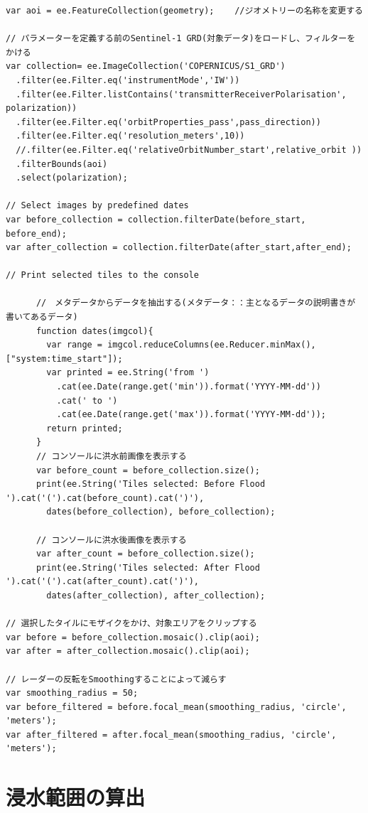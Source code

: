 \documentclass[
]{book}
\begin{document}
\begin{verbatim}
var aoi = ee.FeatureCollection(geometry);    //ジオメトリーの名称を変更する 

// パラメーターを定義する前のSentinel-1 GRD(対象データ)をロードし、フィルターをかける 
var collection= ee.ImageCollection('COPERNICUS/S1_GRD')
  .filter(ee.Filter.eq('instrumentMode','IW'))
  .filter(ee.Filter.listContains('transmitterReceiverPolarisation', polarization))
  .filter(ee.Filter.eq('orbitProperties_pass',pass_direction)) 
  .filter(ee.Filter.eq('resolution_meters',10))
  //.filter(ee.Filter.eq('relativeOrbitNumber_start',relative_orbit ))
  .filterBounds(aoi)
  .select(polarization);
  
// Select images by predefined dates
var before_collection = collection.filterDate(before_start, before_end);
var after_collection = collection.filterDate(after_start,after_end);

// Print selected tiles to the console

      //　メタデータからデータを抽出する(メタデータ：：主となるデータの説明書きが書いてあるデータ)
      function dates(imgcol){
        var range = imgcol.reduceColumns(ee.Reducer.minMax(), ["system:time_start"]);
        var printed = ee.String('from ')
          .cat(ee.Date(range.get('min')).format('YYYY-MM-dd'))
          .cat(' to ')
          .cat(ee.Date(range.get('max')).format('YYYY-MM-dd'));
        return printed;
      }
      // コンソールに洪水前画像を表示する
      var before_count = before_collection.size();
      print(ee.String('Tiles selected: Before Flood ').cat('(').cat(before_count).cat(')'),
        dates(before_collection), before_collection);
      
      // コンソールに洪水後画像を表示する
      var after_count = before_collection.size();
      print(ee.String('Tiles selected: After Flood ').cat('(').cat(after_count).cat(')'),
        dates(after_collection), after_collection);

// 選択したタイルにモザイクをかけ、対象エリアをクリップする
var before = before_collection.mosaic().clip(aoi);
var after = after_collection.mosaic().clip(aoi);

// レーダーの反転をSmoothingすることによって減らす  
var smoothing_radius = 50;
var before_filtered = before.focal_mean(smoothing_radius, 'circle', 'meters');
var after_filtered = after.focal_mean(smoothing_radius, 'circle', 'meters');

\end{verbatim}

\hypertarget{ux6d78ux6c34ux7bc4ux56f2ux306eux7b97ux51fa}{%
\chapter{浸水範囲の算出}\label{ux6d78ux6c34ux7bc4ux56f2ux306eux7b97ux51fa}}
\end{document}
